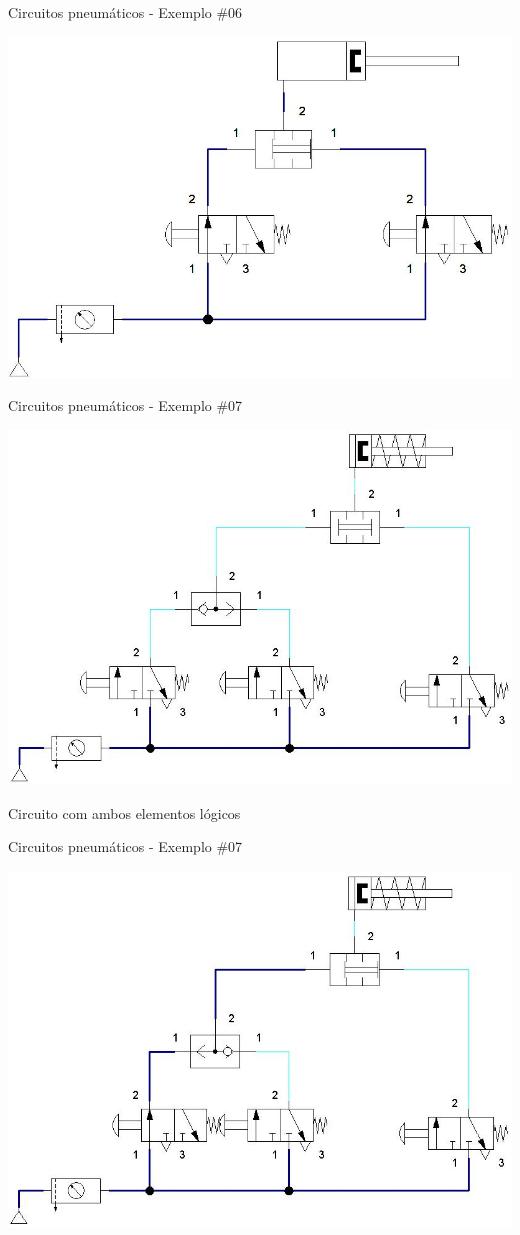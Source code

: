 \begin{frame}{Circuitos pneumáticos - Exemplo \#06}
	
	\centering
	\includegraphics[width=0.8\linewidth]{Figuras/Ch14/fig48n34}
	
\end{frame}


\begin{frame}{Circuitos pneumáticos - Exemplo \#07}
	
	\centering
	\includegraphics[width=0.8\linewidth]{Figuras/Ch14/fig48n4}
	
	\medskip
	
	Circuito com ambos elementos lógicos
	
\end{frame}


\begin{frame}{Circuitos pneumáticos - Exemplo \#07}
	
	\centering
	\includegraphics[width=0.9\linewidth]{Figuras/Ch14/fig48n42}
	
\end{frame}


